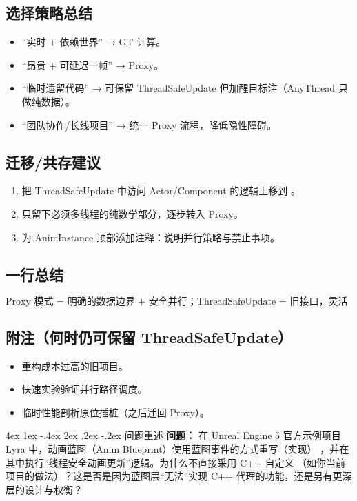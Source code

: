 \documentclass[10pt,openright,oneside,CJKmath]{MyBook}
\makeatletter
\renewcommand{\section}{\@startsection{section}{1}{\z@}%
{4ex \@plus 1ex \@minus -.4ex}%
{2ex \@plus.2ex \@minus -.2ex}%
{\color{black}\rmfamily\large\sffamily\bfseries}}
\makeatother
\begin{document}
\subsection{选择策略总结}
\begin{itemize}
  \item “实时 + 依赖世界” → GT 计算。
  \item “昂贵 + 可延迟一帧” → Proxy。
  \item “临时遗留代码” → 可保留 ThreadSafeUpdate 但加醒目标注（AnyThread 只做纯数据）。
  \item “团队协作/长线项目” → 统一 Proxy 流程，降低隐性障碍。
\end{itemize}

\subsection{迁移/共存建议}
\begin{enumerate}
  \item 把 ThreadSafeUpdate 中访问 Actor/Component 的逻辑上移到 。
  \item 只留下必须多线程的纯数学部分，逐步转入 Proxy。
  \item 为 AnimInstance 顶部添加注释：说明并行策略与禁止事项。
\end{enumerate}

\subsection{一行总结}
\[
\boxed{\text{Proxy 模式 = 明确的数据边界 + 安全并行；ThreadSafeUpdate = 旧接口，灵活但易踩坑。}}
\]

\subsection{附注（何时仍可保留 ThreadSafeUpdate）}
\begin{itemize}
  \item 重构成本过高的旧项目。
  \item 快速实验验证并行路径调度。
  \item 临时性能剖析原位插桩（之后迁回 Proxy）。
\end{itemize}


\section{问题重述}
\textbf{问题：} 在 Unreal Engine 5 官方示例项目 Lyra 中，动画蓝图（Anim Blueprint）使用蓝图事件的方式重写（实现） ，并在其中执行“线程安全动画更新”逻辑。为什么不直接采用 C++ 自定义 （如你当前项目的做法）？这是否是因为蓝图层“无法”实现 C++ 代理的功能，还是另有更深层的设计与权衡？
\end{document}
